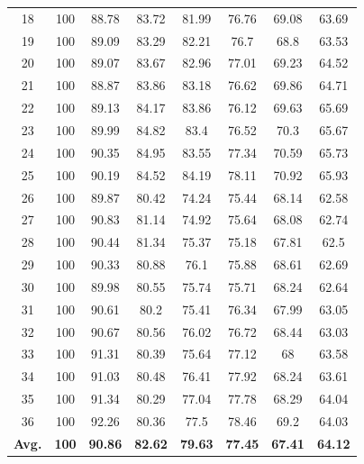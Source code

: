 \documentclass[review]{elsarticle}
\begin{document}
\begin{longtable}{c|ccccccc}
		18&100&88.78&83.72&81.99&76.76&69.08&63.69\\
		19&100&89.09&83.29&82.21&76.7&68.8&63.53\\
		20&100&89.07&83.67&82.96&77.01&69.23&64.52\\
		21&100&88.87&83.86&83.18&76.62&69.86&64.71\\
		22&100&89.13&84.17&83.86&76.12&69.63&65.69\\
		23&100&89.99&84.82&83.4&76.52&70.3&65.67\\
		24&100&90.35&84.95&83.55&77.34&70.59&65.73\\
		25&100&90.19&84.52&84.19&78.11&70.92&65.93\\
		26&100&89.87&80.42&74.24&75.44&68.14&62.58\\
		27&100&90.83&81.14&74.92&75.64&68.08&62.74\\
		28&100&90.44&81.34&75.37&75.18&67.81&62.5\\
		29&100&90.33&80.88&76.1&75.88&68.61&62.69\\
		30&100&89.98&80.55&75.74&75.71&68.24&62.64\\
		31&100&90.61&80.2&75.41&76.34&67.99&63.05\\
		32&100&90.67&80.56&76.02&76.72&68.44&63.03\\
		33&100&91.31&80.39&75.64&77.12&68&63.58\\
		34&100&91.03&80.48&76.41&77.92&68.24&63.61\\
		35&100&91.34&80.29&77.04&77.78&68.29&64.04\\
		36&100&92.26&80.36&77.5&78.46&69.2&64.03\\
		\hline
		\textbf{Avg.}&\textbf{100}&\textbf{90.86}&\textbf{82.62}&\textbf{79.63}&\textbf{77.45}&\textbf{67.41}&\textbf{64.12}\\
		\hline\hline	
\end{longtable}
\end{document}
